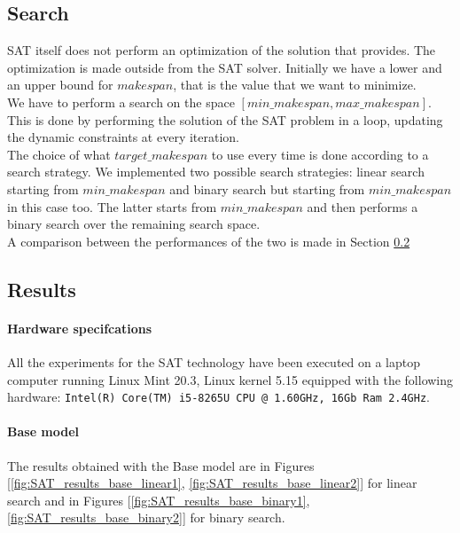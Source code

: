 
\subsection{Search}\label{subsec:SAT_search}
  SAT itself does not perform an optimization of the solution that provides.
  The optimization is made outside from the SAT solver. Initially we have a lower and an upper bound
  for \(makespan\), that is the value that we want to minimize.\\

  We have to perform a search on the space \([min\_makespan, max\_makespan]\). This is done by performing
  the solution of the SAT problem in a loop, updating the dynamic constraints at every iteration.\\

  The choice of what \(target\_makespan\) to use every time is done according to a search strategy.
  We implemented two possible search strategies: linear search starting from \(min\_makespan\) and
  binary search but starting from \(min\_makespan\) in this case too.
  The latter starts from \(min\_makespan\) and then performs a binary search over the remaining
  search space.\\

  A comparison between the performances of the two is made in Section \ref{subsec:SAT_results}


\subsection{Results}\label{subsec:SAT_results}

  \paragraph{Hardware specifcations}
    All the experiments for the SAT technology have been executed on a laptop computer running Linux Mint 20.3, Linux kernel 5.15
    equipped with the following hardware:
    \texttt{Intel(R) Core(TM) i5-8265U CPU @ 1.60GHz, 16Gb Ram 2.4GHz}.

  \paragraph{Base model}
    The results obtained with the Base model are in Figures [\ref{fig:SAT_results_base_linear1}, \ref{fig:SAT_results_base_linear2}]
    for linear search and in Figures [\ref{fig:SAT_results_base_binary1}, \ref{fig:SAT_results_base_binary2}] for binary search.

